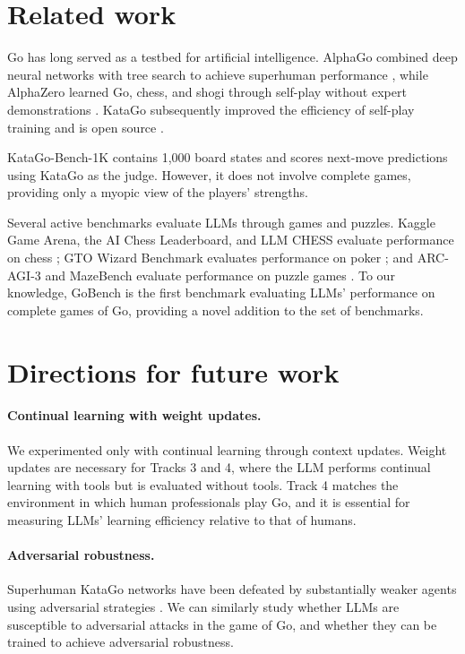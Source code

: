 \documentclass{article}
\begin{document}
\section{Related work}

Go has long served as a testbed for artificial intelligence. AlphaGo combined
deep neural networks with tree search to achieve superhuman performance
\citep{silver2016alphago}, while AlphaZero learned Go, chess, and shogi through
self-play without expert demonstrations \citep{silver2018alphazero}. KataGo
subsequently improved the efficiency of self-play training and is open source \citep{wu2019katago}.

KataGo-Bench-1K \citep{ma2026logos} contains 1,000 board states and scores next-move predictions using KataGo as the judge. However, it does not involve complete games, providing only a myopic view of the players' strengths.

Several active benchmarks evaluate LLMs through games and puzzles. Kaggle Game Arena, the AI Chess Leaderboard, and LLM CHESS evaluate performance on chess \citep{kaggle2026gamearena,dubesor2026leaderboard,kolasani2025llmchess}; GTO Wizard Benchmark evaluates performance on poker \citep{provost2026gtowizard}; and ARC-AGI-3 and MazeBench evaluate performance on puzzle games \citep{arcprizefoundation2026arcagi3,pappas2026mazebench}.
To our knowledge, GoBench is the first benchmark evaluating LLMs' performance on complete games of Go, providing a novel addition to the set of benchmarks.

\section{Directions for future work}

\paragraph{Continual learning with weight updates.}
We experimented only with continual learning through context updates.
Weight updates are necessary for Tracks 3 and 4, where the LLM performs continual learning with tools but is evaluated without tools.
Track 4 matches the environment in which human professionals play Go, and it is essential for measuring LLMs' learning efficiency relative to that of humans.

\paragraph{Adversarial robustness.}
Superhuman KataGo networks have been defeated by substantially weaker agents using adversarial strategies
\citep{wang2023adversarial}.
We can similarly study whether LLMs are susceptible to adversarial attacks in the game of Go,
and whether they can be trained to achieve adversarial robustness.
\end{document}
